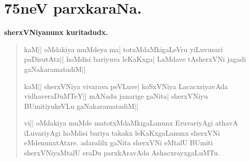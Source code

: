 \chapter{75neV parxkaraNa.}

\begin{center}
{\large\bf sherxVNiyanunx kuritadudx.}
\end{center}

\begin{verse}
kaM|| oMdakiya muMdeya ma| totxMdaMkigaLeVru yiLuvusari paDisutAtx||
hoMdisi bariyuva leKaKxga| LaMdave tAsherxVNi jagadi gaNakaramatadiM||

kaM|| sherxVNiya vivarava peVLuve| koSxVNiya LacacxriyavAda vidhaveraDuMTeY|| mANadu janarige gaNita| sherxVNiyu BUmitiyukeVLu gaNakaramatadiM||

vi|| oMdakiya muMde matotxMdaMkigaLanunx EruvariyAgi athavA iLuvariyAgi hoMdisi bariya takakx leKaKxgaLanunx sherxVNi eMdenunxtAtxre. adaralilx gaNita sherxVNi eMtalU BUmiti sherxVNiyaMtalU eraDu parxkAravAda AshacxrayxgaLuMTu.
\end{verse}

